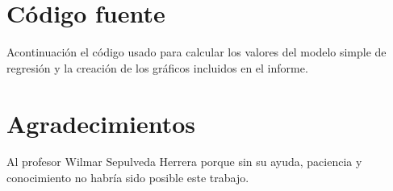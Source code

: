 \documentclass{article}
\begin{document}
\section{Código fuente}
 Acontinuación el código usado para calcular los valores del modelo simple de regresión y la creación de los gráficos incluidos en el informe.


\section{Agradecimientos}
Al profesor Wilmar Sepulveda Herrera porque sin su ayuda, paciencia y conocimiento no habría sido posible este trabajo.
\end{document}
